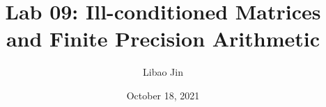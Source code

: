 \title{Lab 09: Ill-conditioned Matrices and Finite Precision Arithmetic}
\author{Libao Jin}
\date{October 18, 2021}